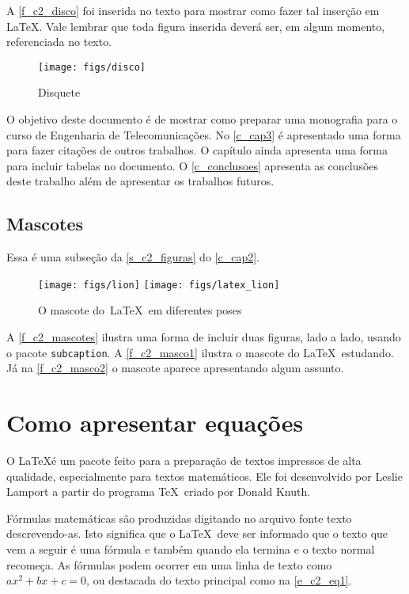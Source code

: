 A \autoref{f_c2_disco} foi inserida no texto para mostrar como fazer tal inserção em \LaTeX. Vale lembrar que toda figura inserida deverá ser, em algum momento, referenciada no texto. 

\begin{figure}[!htpb]
	\centering
	\caption{Disquete}\label{f_c2_disco}
	\texttt{[image: figs/disco]}
\end{figure}

O objetivo deste documento é de mostrar como preparar uma monografia para o curso de Engenharia de Telecomunicações. No \autoref{c_cap3} é apresentado uma forma para fazer citações de outros trabalhos. O capítulo ainda apresenta uma forma para incluir tabelas no documento. O \autoref{c_conclusoes} apresenta as conclusões deste trabalho além de apresentar os trabalhos futuros.

\subsection{Mascotes}
\label{s_c2_mascotes}

Essa é uma subseção da \autoref{s_c2_figuras} do \autoref{c_cap2}. 

\begin{figure}[ht]
	\centering
	\caption{O mascote do~\LaTeX~em diferentes poses}\label{f_c2_mascotes}
		{\texttt{[image: figs/lion]}}
		{\texttt{[image: figs/latex\_lion]}}
\end{figure}


A \autoref{f_c2_mascotes} ilustra uma forma de incluir duas figuras, lado a lado, usando o pacote \texttt{subcaption}. A \autoref{f_c2_masco1} ilustra o mascote do \LaTeX~estudando. Já na \autoref{f_c2_masco2} o mascote aparece apresentando algum assunto. 


\section{Como apresentar equações}
\label{s_c2_equacoes}

O \LaTeX é um pacote feito para a preparação de textos impressos de alta qualidade, especialmente
para textos matemáticos. Ele foi desenvolvido por Leslie Lamport a partir do programa
\TeX~criado por Donald Knuth.

Fórmulas matemáticas são produzidas digitando no arquivo fonte texto descrevendo-as. Isto
significa que o \LaTeX~deve ser informado que o texto que vem a seguir é uma fórmula e também
quando ela termina e o texto normal recomeça. As fórmulas podem ocorrer em uma linha de
texto como $ax^2 + bx + c = 0$, ou destacada do texto principal como na \autoref{e_c2_eq1}.

